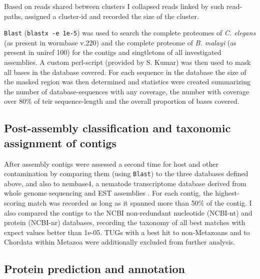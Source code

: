 Based on reads shared between clusters I collapsed reads linked by
such read-paths, assigned a cluster-id and recorded the size of the
cluster.

\texttt{Blast} (\texttt{blastx -e 1e-5}) was used to search the
complete proteomes of \textit{C. elegans} (as present in wormbase
v.220) and the complete proteome of \textit{B. malayi} (as present in
uniref 100) for the contigs and singtletons of all investigated
assemblies. A custom perl-script (provided by S. Kumar) was then used
to mask all bases in the database covered. For each sequence in the
database the size of the masked region was then determined and
statistics were created summarizing the number of database-sequences
with any coverage, the number with coverage over 80\% of teir
sequence-length and the overall proportion of bases covered.

\subsection{Post-assembly classification and taxonomic assignment of
  contigs}

After assembly contigs were assessed a second time for host and other
contamination by comparing them (using \texttt{Blast}) to the three
databases defined above, and also to nembase4, a nematode
transcriptome database derived from whole genome sequencing and EST
assemblies \cite{parkinson_nembase:resource_2004, pmid21550347}. For
each contig, the highest-scoring match was recorded as long as it
spanned more than 50\% of the contig. I also compared the contigs to
the NCBI non-redundant nucleotide (NCBI-nt) and protein (NCBI-nr)
databases, recording the taxonomy of all best matches with expect
values better than 1e-05. TUGs with a best hit to non-Metazoans and to
Chordata within Metazoa were additionally excluded from further
analysis.

\subsection{Protein prediction and annotation}

